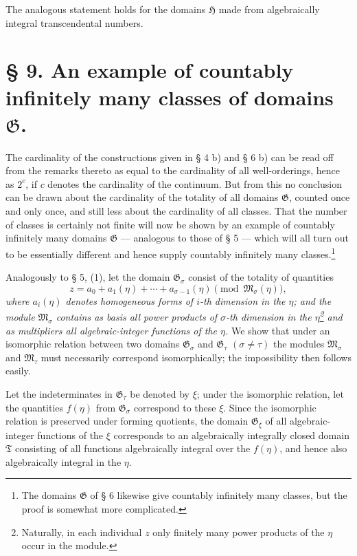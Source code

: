 \documentclass[11pt]{article}
\begin{document}
The analogous statement holds for the domains $\mathfrak H$ made from
algebraically integral transcendental numbers.

\section*{§ 9. An example of countably infinitely many classes of domains $\mathfrak G$.}

The cardinality of the constructions given in § 4 b) and § 6 b) can be read off
from the remarks thereto as equal to the cardinality of all well-orderings, hence
as $2^c$, if $c$ denotes the cardinality of the continuum. But from this no
conclusion can be drawn about the cardinality of the totality of all domains
$\mathfrak G$, counted once and only once, and still less about the cardinality
of all classes. That the number of classes is certainly not finite will now be
shown by an example of countably infinitely many domains $\mathfrak G$ ---
analogous to those of § 5 --- which will all turn out to be essentially
different and hence supply countably infinitely many classes.\footnote{The
domains $\mathfrak G$ of § 6 likewise give countably infinitely many classes, but
the proof is somewhat more complicated.}

Analogously to § 5, (1), let the domain $\mathfrak G_\sigma$ consist of the
totality of quantities
\begin{equation}
 z=a_0+a_1(\eta)+\cdots+a_{\sigma-1}(\eta)
 \pmod{\mathfrak M_\sigma(\eta)},
\tag{1}
\end{equation}
\emph{where $a_i(\eta)$ denotes homogeneous forms of $i$-th dimension in the
$\eta$; and the module $\mathfrak M_\sigma$ contains as basis all power products
of $\sigma$-th dimension in the $\eta$\footnote{Naturally, in each individual
$z$ only finitely many power products of the $\eta$ occur in the module.} and as
multipliers all algebraic-integer functions of the $\eta$.} We show that under
an isomorphic relation between two domains $\mathfrak G_\sigma$ and
$\mathfrak G_\tau$ $(\sigma\ne\tau)$ the modules $\mathfrak M_\sigma$ and
$\mathfrak M_\tau$ must necessarily correspond isomorphically; the impossibility
then follows easily.

Let the indeterminates in $\mathfrak G_\tau$ be denoted by $\xi$; under the
isomorphic relation, let the quantities $f(\eta)$ from $\mathfrak G_\sigma$
correspond to these $\xi$. Since the isomorphic relation is preserved under
forming quotients, the domain $\mathfrak G_\xi$ of all algebraic-integer
functions of the $\xi$ corresponds to an algebraically integrally closed domain
$\mathfrak T$ consisting of all functions algebraically integral over the
$f(\eta)$, and hence also algebraically integral in the $\eta$.
\end{document}

